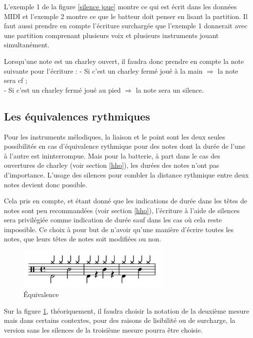 L’exemple 1 de la figure \ref{silence joue} montre ce qui est écrit dans les données MIDI et l’exemple 2 montre ce que le batteur doit penser en lisant la partition. Il faut aussi prendre en compte l’écriture surchargée que l’exemple 1 donnerait avec une partition comprenant plusieurs voix et plusieurs instruments jouant simultanément.

Lorsqu’une note est un charley ouvert, il faudra donc prendre en compte la note suivante pour l’écriture :
- Si c’est un charley fermé joué à la main $\Rightarrow$ la note sera cf ;\\
- Si c’est un charley fermé joué au pied $\Rightarrow$ la note sera un silence.


\subsection*{Les équivalences rythmiques}
Pour les instruments mélodiques, 
la liaison et le point sont les deux seules possibilités en cas d’équivalence rythmique pour des notes dont la durée de l’une à l’autre est ininterrompue. 
Mais pour la batterie, à part dans le cas des ouvertures de charley (voir section \ref{hho}), 
les durées des notes n’ont pas d’importance. 
L’usage des silences pour combler la distance rythmique entre deux notes devient donc possible.

Cela pris en compte, et étant donné que les indications de durée dans les têtes de notes sont peu recommandées (voir section \ref{hho}), l’écriture à l’aide de silences sera privilégiée comme indication de durée sauf dans les cas où cela reste impossible. 
Ce choix à pour but de n’avoir qu’une manière d’écrire toutes les notes, que leurs têtes de notes soit modifiées ou non.

\begin{figure}[h]
	\centering
	\includegraphics[height=20mm, width=75mm]{z_images/3_methodes/0_notation_de_la_batterie/6_equivalence.png}
	\caption{Équivalence}
	\label{equivalence}
\end{figure}

Sur la figure \ref{equivalence}, théoriquement, il faudra choisir la notation de la deuxième mesure mais dans certains contextes, pour des raisons de lisibilité ou de surcharge, la version sans les silences de la troisième mesure pourra être choisie.

